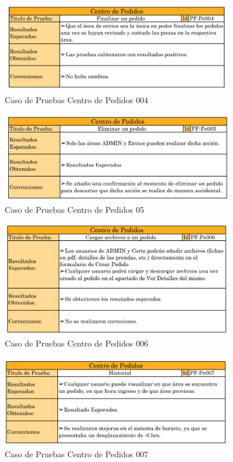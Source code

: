 \documentclass[12pt,letterpaper,spanish]{report}
\begin{document}
\begin{figure}[H]
  \centering
  \includegraphics[width=0.9\textwidth]{PF-Pe004.png}
  \caption{Caso de Pruebas Centro de Pedidos 004}\label{Pe004}
\end{figure}


\begin{figure}[H]
  \centering
  \includegraphics[width=0.9\textwidth]{PF-Pe005.png}
  \caption{Caso de Pruebas Centro de Pedidos 05}\label{Pe005}
\end{figure}

\begin{figure}[H]
  \centering
  \includegraphics[width=0.9\textwidth]{PF-Pe006.png}
  \caption{Caso de Pruebas Centro de Pedidos 006}\label{Pe006}
\end{figure}


\begin{figure}[H]
  \centering
  \includegraphics[width=0.9\textwidth]{PF-Pe007.png}
  \caption{Caso de Pruebas Centro de Pedidos 007}\label{Pe007}
\end{figure}
\end{document}
